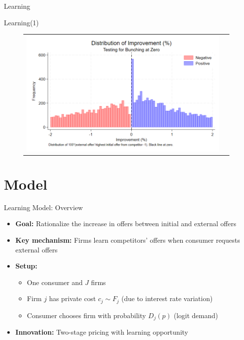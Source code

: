 \documentclass[10pt,aspectratio=169]{beamer}
\begin{document}
\begin{frame}{Learning}\label{slide:fig4}    
\scalebox{0.8}{
    
}
\hyperlink{slide:Descriptive_evidence}{}
\end{frame}


\begin{frame}{Learning(1)}\label{slide:fig5}
  \begin{figure}[H]
\centering{}%
\begin{tabular}{cc}
\includegraphics[scale=0.39]{../figures/IE7/IE7_hist_bunching_max(2).png} 
\end{tabular}
\end{figure}
\hyperlink{slide:Descriptive_evidence}{}
\end{frame}

\section{Model}



\begin{frame}{Learning Model: Overview}
\begin{itemize}
    \item \textbf{Goal:} Rationalize the increase in offers between initial and external offers
    
    \item \textbf{Key mechanism:} Firms learn competitors' offers when consumer requests external offers
    
    \item \textbf{Setup:}
    \begin{itemize}
        \item One consumer and $J$ firms
        \item Firm $j$ has private cost $c_j \sim F_j$ (due to interest rate variation)
        \item Consumer chooses firm with probability $D_j(p)$ (logit demand)
    \end{itemize}
    
    \item \textbf{Innovation:} Two-stage pricing with learning opportunity
\end{itemize}
\end{frame}
\end{document}

